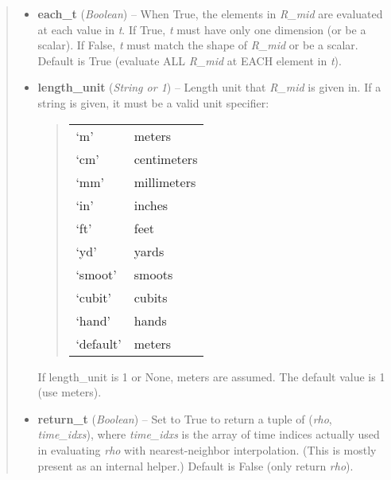 \documentclass[letterpaper,10pt,english]{sphinxmanual}
\begin{document}
\begin{fulllineitems}
\begin{fulllineitems}
\begin{quote}
\begin{description}
\begin{itemize}
\item {} 
\textbf{each\_t} (\emph{Boolean}) --
When True, the elements in \emph{R\_mid} are evaluated
at each value in \emph{t}. If True, \emph{t} must have only one dimension
(or be a scalar). If False, \emph{t} must match the shape of \emph{R\_mid}
or be a scalar. Default is True (evaluate ALL \emph{R\_mid} at EACH
element in \emph{t}).

\item {} 
\textbf{length\_unit} (\emph{String or 1}) --
Length unit that \emph{R\_mid} is given in.
If a string is given, it must be a valid unit specifier:
\begin{quote}

\begin{tabulary}{\linewidth}{|L|L|}
\hline

`m'
 & 
meters
\\

`cm'
 & 
centimeters
\\

`mm'
 & 
millimeters
\\

`in'
 & 
inches
\\

`ft'
 & 
feet
\\

`yd'
 & 
yards
\\

`smoot'
 & 
smoots
\\

`cubit'
 & 
cubits
\\

`hand'
 & 
hands
\\

`default'
 & 
meters
\\
\hline\end{tabulary}

\end{quote}

If length\_unit is 1 or None, meters are assumed. The default
value is 1 (use meters).

\item {} 
\textbf{return\_t} (\emph{Boolean}) --
Set to True to return a tuple of (\emph{rho},
\emph{time\_idxs}), where \emph{time\_idxs} is the array of time indices
actually used in evaluating \emph{rho} with nearest-neighbor
interpolation. (This is mostly present as an internal helper.)
Default is False (only return \emph{rho}).

\end{itemize}


\end{description}
\end{quote}
\end{fulllineitems}
\end{fulllineitems}
\end{document}
